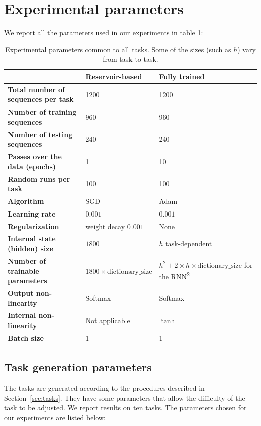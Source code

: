 \section{Experimental parameters}
\label{sec:parameters}
We report all the parameters used in our experiments in table \ref{tab:appendix-params}:
\begin{table}[htbp]
  \centering
  \begin{tabular}{lp{.2\linewidth}p{.35\linewidth}}
    \toprule
    & \bfseries Reservoir-based & \bfseries Fully trained \\
    \midrule
    \bfseries Total number of sequences per task & 1200 & 1200 \\
    \bfseries Number of training sequences & 960 & 960 \\
    \bfseries Number of testing sequences & 240 & 240 \\
    \bfseries Passes over the data (epochs) & 1 & 10 \\
    \bfseries Random runs per task & 100 & 100\\
    \bfseries Algorithm & SGD & Adam \parencite{kingmaAdamMethodStochastic2015}\\
    \bfseries Learning rate & $0.001$ & $0.001$ \\
    \bfseries Regularization & weight decay $0.001$ & None \\
    \bfseries Internal state (hidden) size & $1800$ & $h$ task-dependent \\
    \bfseries Number of trainable parameters & $1800 \times \text{dictionary\_size}$ &
      $h^{2} + 2 \times h \times \text{dictionary\_size}$ for the RNN\textsuperscript{2}\\
    \bfseries Output non-linearity & Softmax & Softmax \\
    \bfseries Internal non-linearity & Not applicable & $\tanh$ \\
    \bfseries Batch size  & 1 & 1 \\
    \bottomrule
  \end{tabular}
  \caption{Experimental parameters common to all tasks. Some of the sizes (such
    as $h$) vary from task to task.}
  \label{tab:appendix-params}
\end{table}

\subsection{Task generation parameters\label{sec:task-gen-params}}
The tasks are generated according to the procedures described in
Section~\ref{sec:tasks}. They have some parameters that allow the
difficulty of the task to be adjusted. We report results on ten tasks. The parameters
chosen for our experiments are listed below:


